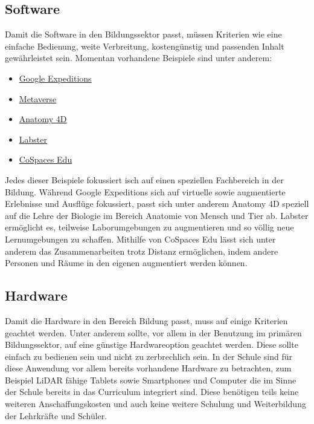 \documentclass[conference]{IEEEtran}
\begin{document}
\subsection{Software}
Damit die Software in den Bildungssektor passt, müssen Kriterien wie eine einfache Bedienung,
weite Verbreitung, kostengünstig und passenden Inhalt gewährleistet sein. Momentan
vorhandene Beispiele sind unter anderem:
\begin{itemize}
    \item \href{https://sites.google.com/dublinschools.net/vr-ar/google-geo-tools/google-expeditions}{Google Expeditions}
    \item \href{https://koerber-stiftung.de/projekte/eustory/teaching-and-learning-in-the-metaverse/}{Metaverse}
    \item \href{https://www.4danatomy.com/}{Anatomy 4D}
    \item \href{https://www.labster.com/}{Labster}
    \item \href{https://www.cospaces.io/}{CoSpaces Edu}
\end{itemize}
Jedes dieser Beispiele fokussiert isch auf einen speziellen Fachbereich
in der Bildung. Während Google Expeditions sich auf virtuelle sowie augmentierte
Erlebnisse und Ausflüge fokussiert, passt sich unter anderem Anatomy 4D speziell
auf die Lehre der Biologie im Bereich Anatomie von Mensch und Tier ab. 
Labster ermöglicht es, teilweise Laborumgebungen zu augmentieren und so völlig neue
Lernumgebungen zu schaffen. Mithilfe von CoSpaces Edu lässt sich unter anderem
das Zusammenarbeiten trotz Distanz ermöglichen, indem andere Personen und Räume in 
den eigenen augmentiert werden können. \cite{w1}

\subsection{Hardware}
Damit die Hardware in den Bereich Bildung passt, muss auf einige Kriterien geachtet werden.
Unter anderem sollte, vor allem in der Benutzung im primären Bildungssektor, auf eine günstige
Hardwareoption geachtet werden. Diese sollte einfach zu bedienen sein und nicht zu zerbrechlich sein.
In der Schule sind für diese Anwendung vor allem bereits vorhandene Hardware zu betrachten, zum Beispiel
LiDAR fähige Tablets sowie Smartphones und Computer die im Sinne der Schule bereits in das Curriculum
integriert sind. Diese benötigen teils keine weiteren Anschaffungskosten und auch keine weitere Schulung und
Weiterbildung der Lehrkräfte und Schüler.
\end{document}
